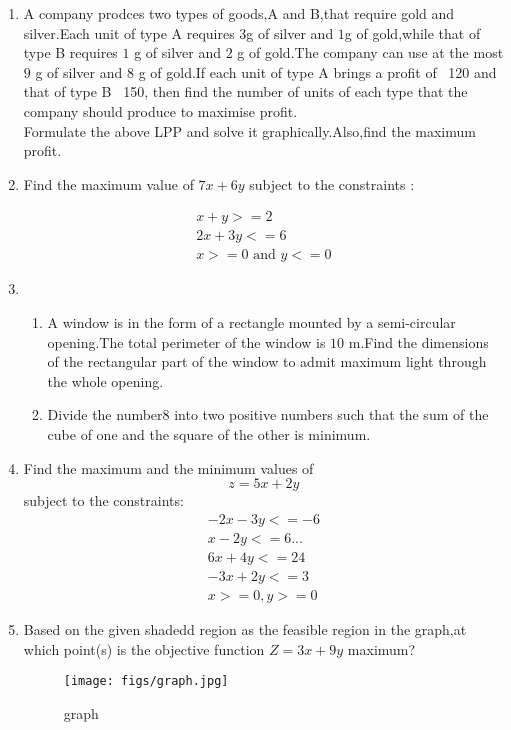 \documentclass{article}
\begin{document}
\begin{enumerate} 
 \item A company prodces two types of goods,A and B,that require gold and silver.Each unit of type A requires $3$g of silver and $1$g of gold,while that of type B requires $1$ g of silver and $2$ g of gold.The company can use at the most $9$ g of silver and $8$ g of gold.If each unit of  type A brings a profit of \rupee~120 and that of type B \rupee~150, then find the number of units of each type that the company should produce to maximise profit.\\
		Formulate the above LPP and solve it graphically.Also,find the maximum profit.
\item Find the maximum value of $7x+6y$ subject to the constraints :

		\begin{align}
			x+y>=2\\
			2x+3y<=6\\
			x>=0{\text{ and }} y<=0
		\end{align}
\item \begin{enumerate} %
			\item A window is in the form of a rectangle mounted by a semi-circular opening.The total perimeter of the window is $10$ m.Find the dimensions of the rectangular part of the window to admit maximum light through the whole opening.
			\item Divide the number$8$ into two positive numbers such that the sum of the cube of one and the square of the other is minimum.
	               \end{enumerate}
\item 
 Find the maximum and the minimum values of $$z=5x+2y$$ subject to the constraints:
	\\
	\begin{align}
		    -2x-3y<=-6
		 \\  x-2y<=6...
		 \\  6x+4y<=24
		  \\  -3x+2y<=3
		  \\  x>=0,y>=0
	\end{align}
	\item Based on the given shadedd region as the feasible region in the graph,at which point(s) is the objective function $Z=3x+9y$ maximum?
	\begin{figure}[H]
	\centering
		\texttt{[image: figs/graph.jpg]}
		\caption{graph}
		\label{fig:graph.jpg}
	\end{figure}

\end{enumerate}
\end{document}
